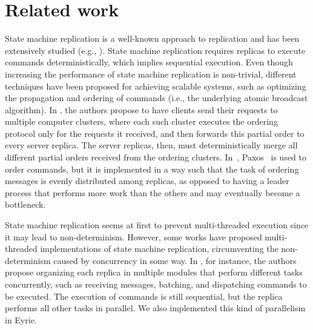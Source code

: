 \documentclass[11pt]{article}
\begin{document}
\section{Related work}

State machine replication is a well-known approach to replication and has been extensively studied (e.g., \cite{kapritsos2012eve, kotla2004htbft, Lam78, santos2013htsmr, Sch90}).
State machine replication requires replicas to execute commands deterministically, which implies sequential execution.
Even though increasing the performance of state machine replication is non-trivial, different techniques have been proposed for achieving scalable systems, such as optimizing the propagation and ordering of commands (i.e., the underlying atomic broadcast algorithm).
In \cite{kapritsos2010scalable}, the authors propose to have clients send their requests to multiple computer clusters, where each such cluster executes the ordering protocol only for the requests it received, and then forwards this partial order to every server replica.
The server replicas, then, must deterministically merge all different partial orders received from the ordering clusters.
In~\cite{biely2012spaxos}, Paxos~\cite{Lam98} is used to order commands, but it is implemented in a way such that the task of ordering messages is evenly distributed among replicas, as opposed to having a leader process that performs more work than the others and may eventually become a bottleneck. 

State machine replication seems at first to prevent multi-threaded execution since it may lead to non-determinism. 
However, some works have proposed multi-threaded implementations of state machine replication, circumventing the non-determinism caused by concurrency in some way. 
In \cite{santos2013htsmr}, for instance, the authors propose organizing each replica in multiple modules that perform different tasks concurrently, such as receiving messages, batching, and dispatching commands to be executed.
The execution of commands is still sequential, but the replica performs all other tasks in parallel. We also implemented this kind of parallelism in Eyrie.
\end{document}
